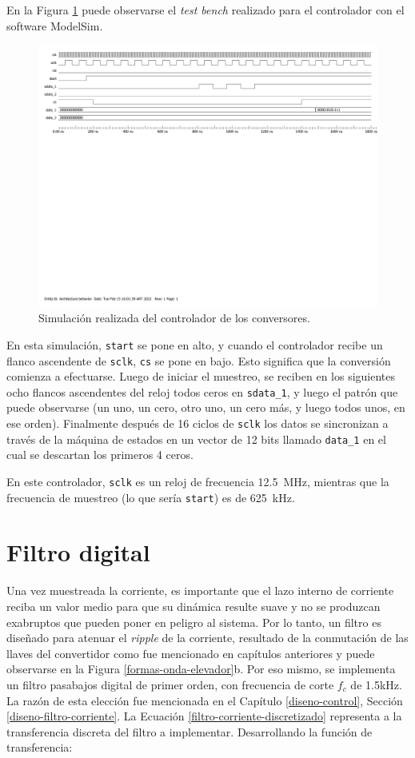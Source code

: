 En la Figura \ref{adc-controller} puede observarse el \emph{test bench} realizado para el controlador con el software ModelSim.

\begin{figure}[hbt!]
    \centering
    \includegraphics[width=0.85\columnwidth]{Imágenes/Conversor analógico-digital/Test bench.pdf}
    \caption{Simulación realizada del controlador de los conversores.}
    \label{adc-controller}
\end{figure} 

En esta simulación, \texttt{start} se pone en alto, y cuando el controlador recibe un flanco ascendente de \texttt{sclk}, \texttt{cs} se pone en bajo. Esto significa que la conversión comienza a efectuarse. Luego de iniciar el muestreo, se reciben en los siguientes ocho flancos ascendentes del reloj todos ceros en \texttt{sdata\_1}, y luego el patrón que puede observarse (un uno, un cero, otro uno, un cero más, y luego todos unos, en ese orden). Finalmente después de 16 ciclos de \texttt{sclk} los datos se sincronizan a través de la máquina de estados en un vector de 12 bits llamado \texttt{data\_1} en el cual se descartan los primeros 4 ceros.

En este controlador, \texttt{sclk} es un reloj de frecuencia \SI{12.5}{\mega\hertz}, mientras que la frecuencia de muestreo (lo que sería \texttt{start}) es de \SI{625}{\kilo\hertz}. 

\section{Filtro digital}

Una vez muestreada la corriente, es importante que el lazo interno de corriente reciba un valor medio para que su dinámica resulte suave y no se produzcan exabruptos que pueden poner en peligro al sistema. Por lo tanto, un filtro es diseñado para atenuar el \emph{ripple} de la corriente, resultado de la conmutación de las llaves del convertidor como fue mencionado en capítulos anteriores y puede observarse en la Figura \ref{formas-onda-elevador}b. Por eso mismo, se implementa un filtro pasabajos digital de primer orden, con frecuencia de corte $f_c$ de 1.5kHz. La razón de esta elección fue mencionada en el Capítulo \ref{diseno-control}, Sección \ref{diseno-filtro-corriente}. La Ecuación \ref{filtro-corriente-discretizado} representa a la transferencia discreta del filtro a implementar. Desarrollando la función de transferencia:


